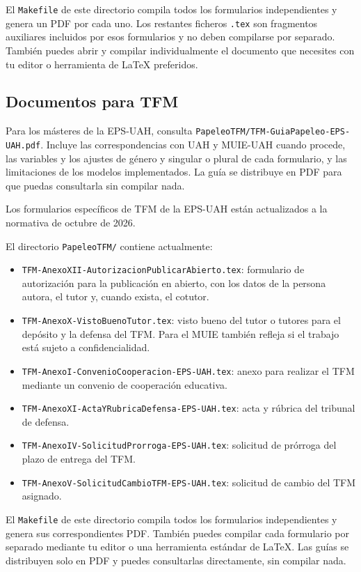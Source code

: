 El \texttt{Makefile} de este directorio compila todos los formularios independientes y genera un PDF por cada uno. Los restantes ficheros \texttt{.tex} son fragmentos auxiliares incluidos por esos formularios y no deben compilarse por separado. También puedes abrir y compilar individualmente el documento que necesites con tu editor o herramienta de \LaTeX{} preferidos.

\subsection{Documentos para TFM}

Para los másteres de la EPS-UAH, consulta \texttt{PapeleoTFM/TFM-GuiaPapeleo-EPS-UAH.pdf}. Incluye las correspondencias con UAH y MUIE-UAH cuando procede, las variables y los ajustes de género y singular o plural de cada formulario, y las limitaciones de los modelos implementados. La guía se distribuye en PDF para que puedas consultarla sin compilar nada.

Los formularios específicos de TFM de la EPS-UAH están actualizados a la normativa de octubre de 2026.

El directorio \texttt{PapeleoTFM/} contiene actualmente:

\begin{itemize}
  \item \texttt{TFM-AnexoXII-AutorizacionPublicarAbierto.tex}: formulario de autorización para la publicación en abierto, con los datos de la persona autora, el tutor y, cuando exista, el cotutor.
  \item \texttt{TFM-AnexoX-VistoBuenoTutor.tex}: visto bueno del tutor o tutores para el depósito y la defensa del TFM. Para el MUIE también refleja si el trabajo está sujeto a confidencialidad.
  \item \texttt{TFM-AnexoI-ConvenioCooperacion-EPS-UAH.tex}: anexo para realizar el TFM mediante un convenio de cooperación educativa.
  \item \texttt{TFM-AnexoXI-ActaYRubricaDefensa-EPS-UAH.tex}: acta y rúbrica del tribunal de defensa.
  \item \texttt{TFM-AnexoIV-SolicitudProrroga-EPS-UAH.tex}: solicitud de prórroga del plazo de entrega del TFM.
  \item \texttt{TFM-AnexoV-SolicitudCambioTFM-EPS-UAH.tex}: solicitud de cambio del TFM asignado.
\end{itemize}

El \texttt{Makefile} de este directorio compila todos los formularios independientes y genera sus correspondientes PDF. También puedes compilar cada formulario por separado mediante tu editor o una herramienta estándar de \LaTeX{}. Las guías se distribuyen solo en PDF y puedes consultarlas directamente, sin compilar nada.


